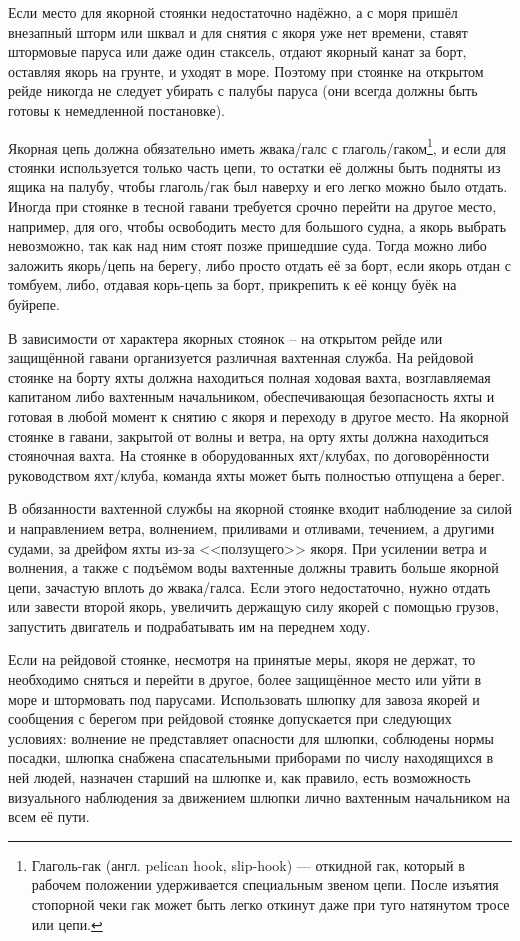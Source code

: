 Если место для якорной стоянки недостаточно надёжно, а с моря пришёл
внезапный шторм или шквал и для снятия с якоря уже нет времени, ставят
штормовые паруса или даже один стаксель, отдают якорный канат за борт,
оставляя якорь на грунте, и уходят в море. Поэтому при стоянке на
открытом рейде никогда не следует убирать с палубы паруса (они всегда
должны быть готовы к немедленной постановке).

Якорная цепь должна обязательно иметь жвака\-/галс с
глаголь\-/гаком\footnote{Глаголь-гак (англ. pelican hook, slip-hook) —
  откидной гак, который в рабочем положении удерживается специальным
  звеном цепи. После изъятия стопорной чеки гак может быть легко
  откинут даже при туго натянутом тросе или цепи.},
и если для стоянки используется только часть цепи, то остатки её
должны быть подняты из ящика на палубу, чтобы глаголь\-/гак был
наверху и его легко можно было отдать. Иногда при стоянке в тесной
гавани требуется срочно перейти на другое место, например, для ого,
чтобы освободить место для большого судна, а якорь выбрать невозможно,
так как над ним стоят позже пришедшие суда. Тогда можно либо заложить
якорь\-/цепь на берегу, либо просто отдать её за борт, если якорь
отдан с томбуем, либо, отдавая корь-цепь за борт, прикрепить к её
концу буёк на буйрепе.

В зависимости от характера якорных стоянок \--- на открытом рейде или
защищённой гавани организуется различная вахтенная служба. На рейдовой
стоянке на борту яхты должна находиться полная ходовая вахта,
возглавляемая капитаном либо вахтенным начальником, обеспечивающая
безопасность яхты и готовая в любой момент к снятию с якоря и переходу
в другое место. На якорной стоянке в гавани, закрытой от волны и
ветра, на орту яхты должна находиться стояночная вахта. На стоянке в
оборудованных яхт\-/клубах, по договорённости руководством
яхт\-/клуба, команда яхты может быть полностью отпущена а берег.

В обязанности вахтенной службы на якорной стоянке входит наблюдение за
силой и направлением ветра, волнением, приливами и отливами, течением,
а другими судами, за дрейфом яхты из-за <<ползущего>> якоря. При
усилении ветра и волнения, а также с подъёмом воды вахтенные должны
травить больше якорной цепи, зачастую вплоть до
жвака\-/галса. Если этого недостаточно, нужно отдать
или завести второй якорь, увеличить держащую силу якорей с помощью
грузов, запустить двигатель и подрабатывать им на переднем ходу.

Если на рейдовой стоянке, несмотря на принятые меры, якоря не держат,
то необходимо сняться и перейти в другое, более защищённое место или
уйти в море и штормовать под парусами. Использовать шлюпку для завоза
якорей и сообщения с берегом при рейдовой стоянке допускается при
следующих условиях: волнение не представляет опасности для шлюпки,
соблюдены нормы посадки, шлюпка снабжена спасательными приборами по
числу находящихся в ней людей, назначен старший на шлюпке и, как
правило, есть возможность визуального наблюдения за движением шлюпки
лично вахтенным начальником на всем её пути.

